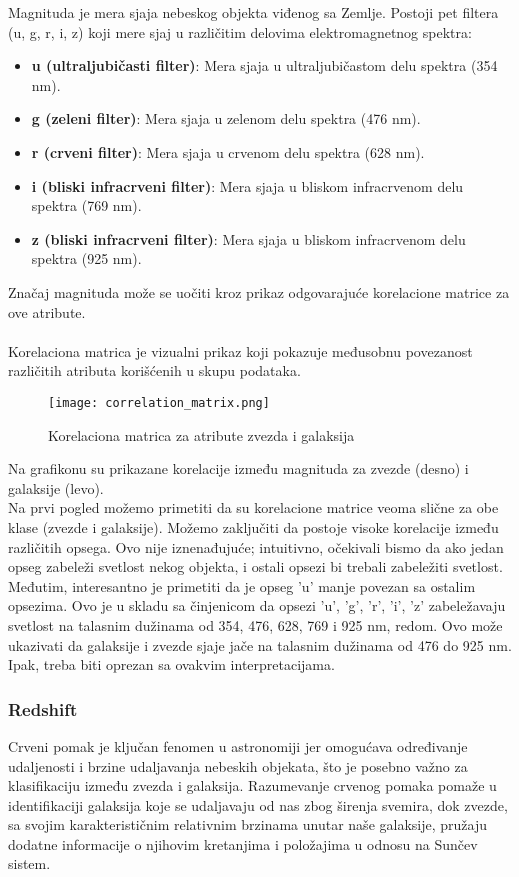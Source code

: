 \documentclass[a4paper,12pt]{article}
\begin{document}
Magnituda je mera sjaja nebeskog objekta viđenog sa Zemlje. Postoji pet filtera (u, g, r, i, z) koji mere sjaj u različitim delovima elektromagnetnog spektra:

\begin{itemize}
    \item \textbf{u (ultraljubičasti filter)}: Mera sjaja u ultraljubičastom delu spektra (354 nm).
    \item \textbf{g (zeleni filter)}: Mera sjaja u zelenom delu spektra (476 nm).
    \item \textbf{r (crveni filter)}: Mera sjaja u crvenom delu spektra (628 nm).
    \item \textbf{i (bliski infracrveni filter)}: Mera sjaja u bliskom infracrvenom delu spektra (769 nm).
    \item \textbf{z (bliski infracrveni filter)}: Mera sjaja u bliskom infracrvenom delu spektra (925 nm).
\end{itemize}
Značaj magnituda može se uočiti kroz prikaz odgovarajuće korelacione matrice za ove atribute.
\\\\Korelaciona matrica je vizualni prikaz koji pokazuje međusobnu povezanost različitih atributa korišćenih u skupu podataka.

\begin{figure}[H]
\centering
\texttt{[image: correlation\_matrix.png]}
\caption{Korelaciona matrica za atribute zvezda i galaksija}
\label{fig:correlation_matrix}
\end{figure}

Na grafikonu su prikazane korelacije između magnituda za zvezde (desno) i galaksije (levo).
\\Na prvi pogled možemo primetiti da su korelacione matrice veoma slične za obe klase (zvezde i galaksije). Možemo zaključiti da postoje visoke korelacije između različitih opsega. Ovo nije iznenađujuće; intuitivno, očekivali bismo da ako jedan opseg zabeleži svetlost nekog objekta, i ostali opsezi bi trebali zabeležiti svetlost. Međutim, interesantno je primetiti da je opseg 'u' manje povezan sa ostalim opsezima. Ovo je u skladu sa činjenicom da opsezi 'u', 'g', 'r', 'i', 'z' zabeležavaju svetlost na talasnim dužinama od 354, 476, 628, 769 i 925 nm, redom. Ovo može ukazivati da galaksije i zvezde sjaje jače na talasnim dužinama od 476 do 925 nm. Ipak, treba biti oprezan sa ovakvim interpretacijama.

\subsubsection{Redshift}
Crveni pomak je ključan fenomen u astronomiji jer omogućava određivanje udaljenosti i brzine udaljavanja nebeskih objekata, što je posebno važno za klasifikaciju između zvezda i galaksija. Razumevanje crvenog pomaka pomaže u identifikaciji galaksija koje se udaljavaju od nas zbog širenja svemira, dok zvezde, sa svojim karakterističnim relativnim brzinama unutar naše galaksije, pružaju dodatne informacije o njihovim kretanjima i položajima u odnosu na Sunčev sistem.
\end{document}
